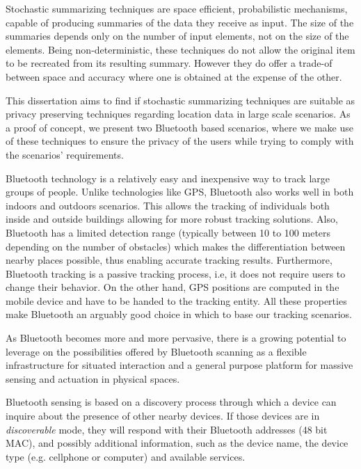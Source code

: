 Stochastic summarizing techniques are space efficient, probabilistic
mechanisms, capable of producing summaries of the data they receive as
input.  The size of the summaries depends only on the number of input
elements, not on the size of the elements. Being non-deterministic,
these techniques do not allow the original item to be recreated from
its resulting summary. However they do offer a trade-of between space
and accuracy where one is obtained at the expense of the other.


This dissertation aims to find if stochastic summarizing techniques
are suitable as privacy preserving techniques regarding location
data in large scale scenarios. As a proof of concept, we present two
Bluetooth based scenarios, where we make use of these techniques
to ensure the privacy of the users while trying to comply with the
scenarios' requirements.

Bluetooth technology is a relatively easy and inexpensive way to track
large groups of people. Unlike technologies like GPS, Bluetooth also
works well in both indoors and outdoors scenarios. This allows the
tracking of individuals both inside and outside buildings allowing for
more robust tracking solutions.  Also, Bluetooth has a limited
detection range (typically between 10 to 100 meters depending on the
number of obstacles) which makes the differentiation between nearby places
possible, thus enabling accurate tracking results. Furthermore,
Bluetooth tracking is a passive tracking process, i.e, it does not
require users to change their behavior. On the other hand, GPS
positions are computed in the mobile device and have to be handed to
the tracking entity.  All these properties make Bluetooth an arguably
good choice in which to base our tracking scenarios.

As Bluetooth becomes more and more pervasive, there is a growing
potential to leverage on the possibilities offered by Bluetooth
scanning as a flexible infrastructure for situated interaction and a
general purpose platform for massive sensing and actuation in physical
spaces.

Bluetooth sensing is based on a discovery process through
which a device can inquire about the presence of other nearby devices.
If those devices are in \emph{discoverable} mode, they will respond
with their Bluetooth addresses (48 bit MAC), and possibly additional
information, such as the device name, the device type (e.g. cellphone
or computer) and available services.

